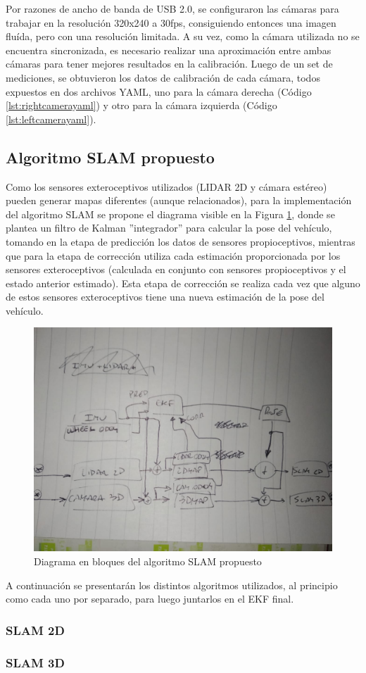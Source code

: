 Por razones de ancho de banda de USB 2.0, se configuraron las cámaras para trabajar en la resolución 320x240 a 30fps, consiguiendo entonces una imagen fluída, pero con una resolución limitada. A su vez, como la cámara utilizada no se encuentra sincronizada, es necesario realizar una aproximación entre ambas cámaras para tener mejores resultados en la calibración. Luego de un set de mediciones, se obtuvieron los datos de calibración de cada cámara, todos expuestos en dos archivos YAML, uno para la cámara derecha (Código \ref{lst:rightcamerayaml}) y otro para la cámara izquierda (Código \ref{lst:leftcamerayaml}).



\subsection{Algoritmo SLAM propuesto}
Como los sensores exteroceptivos utilizados (LIDAR 2D y cámara estéreo) pueden generar mapas diferentes (aunque relacionados), para la implementación del algoritmo SLAM se propone el diagrama visible en la Figura \ref{fig:slamalgorithmblockdiagram}, donde se plantea un filtro de Kalman ''integrador'' para calcular la pose del vehículo, tomando en la etapa de predicción los datos de sensores propioceptivos, mientras que para la etapa de corrección utiliza cada estimación proporcionada por los sensores exteroceptivos (calculada en conjunto con sensores propioceptivos y el estado anterior estimado). Esta etapa de corrección se realiza cada vez que alguno de estos sensores exteroceptivos tiene una nueva estimación de la pose del vehículo.
\begin{figure}
    \centering
    \includegraphics[width=\textwidth]{Img/SLAMAlgorithmBlockDiagram.jpeg}
    \caption{Diagrama en bloques del algoritmo SLAM propuesto}
    \label{fig:slamalgorithmblockdiagram}
\end{figure}

A continuación se presentarán los distintos algoritmos utilizados, al principio como cada uno por separado, para luego juntarlos en el EKF final.

\subsubsection{SLAM 2D}

\subsubsection{SLAM 3D}